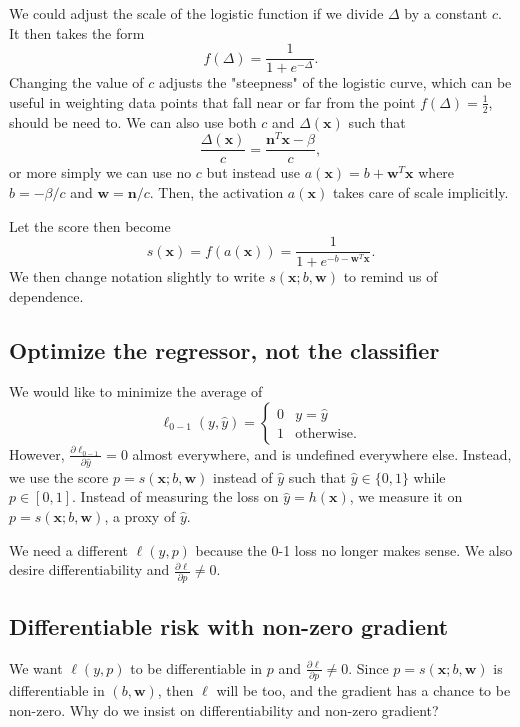 \documentclass[titlepage, 12pt, leqno]{article}
\begin{document}
We could adjust the scale of the logistic function if we divide $\Delta$ by a constant
$c$. It then takes the form
\[
f(\Delta) = \frac{1}{1+e^{-\Delta}}.
\]
Changing the value of $c$ adjusts the "steepness" of the logistic curve, which can be
useful in weighting data points that fall near or far from the point $f(\Delta) = 
\frac{1}{2}$, should be need to. We can also use both $c$ and $\Delta(\textbf{x})$ such
that
\[
\frac{\Delta(\textbf{x})}{c} = \frac{\textbf{n}^{T}\textbf{x}-\beta}{c},
\]
or more simply we can use no $c$ but instead use $a(\textbf{x}) = b+\textbf{w}^{T}
\textbf{x}$ where $b = -\beta/c$ and $\textbf{w} = \textbf{n}/c$. Then, the activation
$a(\textbf{x})$ takes care of scale implicitly.

Let the score then become
\[
s(\textbf{x}) = f(a(\textbf{x})) = \frac{1}{1 + e^{-b-\textbf{w}^{T}\textbf{x}}}.
\]
We then change notation slightly to write $s(\textbf{x}; b, \textbf{w})$ to remind us of
dependence.

\subsection{Optimize the regressor, not the classifier}
We would like to minimize the average of 
\[
\ell_{0-1}(y, \hat y) =
\begin{cases}
    0 & y=\hat y \\
    1 & \text{otherwise}.
\end{cases}
\]
However, $\frac{\partial \ell_{0-1}}{\partial \hat y}=0$ almost everywhere, and is 
undefined everywhere else. Instead, we use the score $p = s(\textbf{x};b,\textbf{w})$
instead of $\hat y$ such that $\hat y \in \{0,1\}$ while $p \in [0,1]$. Instead of 
measuring the loss on $\hat y = h(\textbf{x})$, we measure it on $p = s(\textbf{x};
b, \textbf{w})$, a proxy of $\hat y$. 

We need a different $\ell(y,p)$ because the 0-1 loss no longer makes sense. We also
desire differentiability and $\frac{\partial \ell}{\partial p}\ne 0$.

\subsection{Differentiable risk with non-zero gradient}
We want $\ell(y,p)$ to be differentiable in $p$ and $\frac{\partial \ell}{\partial p}
\ne 0$. Since $p = s(\textbf{x}; b, \textbf{w})$ is differentiable in $(b,\textbf{w})$, 
then $\ell$ will be too, and the gradient has a chance to be non-zero. Why do we insist
on differentiability and non-zero gradient?
\end{document}
